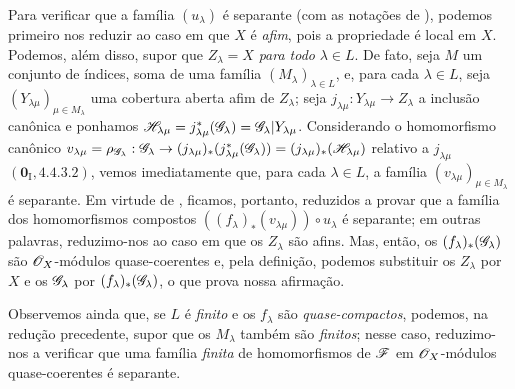 \begin{env}[11.9.3]
\label{IV.11.9.3}
Para verificar que a família
$(u_\lambda)$ é separante
(com as notações de
), podemos
primeiro nos reduzir ao
caso em que $X$ é
\emph{afim}, pois a
propriedade é local em
$X$. Podemos, além disso,
supor que $Z_\lambda=X$
\emph{para todo}
$\lambda\in L$. De fato,
seja $M$ um conjunto de
índices, soma de uma
família
$(M_\lambda)_{\lambda\in L}$,
e, para cada
$\lambda\in L$, seja
$(Y_{\lambda\mu})_
{\mu\in M_\lambda}$
uma cobertura aberta afim
de $Z_\lambda$; seja
$j_{\lambda\mu}:
Y_{\lambda\mu}\to Z_\lambda$
a inclusão canônica e
ponhamos
$\mathscr{H}_{\lambda\mu}
=j_{\lambda\mu}^*
(\mathscr{G}_\lambda)
=\mathscr{G}_\lambda|
Y_{\lambda\mu}$.
Considerando o
homomorfismo canônico
$v_{\lambda\mu}
=\rho_{\sh{G}_\lambda}:
\sh{G}_\lambda\to
(j_{\lambda\mu})_*
(j_{\lambda\mu}^*
(\sh{G}_\lambda))
=(j_{\lambda\mu})_*
(\sh{H}_{\lambda\mu})$
relativo a
$j_{\lambda\mu}$
$(\mathbf 0_{\mathrm I},
4.4.3.2)$, vemos
imediatamente que, para
cada $\lambda\in L$,
a família
$(v_{\lambda\mu})_
{\mu\in M_\lambda}$
é separante. Em virtude
de ,
ficamos, portanto,
reduzidos a provar que
a família dos
homomorfismos compostos
$((f_\lambda)_*
(v_{\lambda\mu}))
\circ u_\lambda$ é
separante; em outras
palavras, reduzimo-nos
ao caso em que os
$Z_\lambda$ são afins.
Mas, então, os
$(f_\lambda)_*
(\mathscr{G}_\lambda)$ são
$\mathscr{O}_X$-módulos
quase-coerentes
 e,
pela definição, podemos
substituir os $Z_\lambda$
por $X$ e os
$\mathscr{G}_\lambda$ por
$(f_\lambda)_*
(\mathscr{G}_\lambda)$,
o que prova nossa
afirmação.

Observemos ainda que,
se $L$ é \emph{finito}
e os $f_\lambda$ são
\emph{quase-compactos},
podemos, na redução
precedente, supor que
os $M_\lambda$ também
são \emph{finitos};
nesse caso, reduzimo-nos
a verificar que uma
família \emph{finita}
de homomorfismos de
$\mathscr{F}$ em
$\mathscr{O}_X$-módulos
quase-coerentes é
separante.
\end{env}

